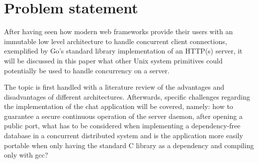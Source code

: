 \section{Problem statement}
After having seen how modern web frameworks provide their users with an immutable low level architecture to handle concurrent client connections, exemplified by Go's standard library implementation of an HTTP(s) server, it will be discussed in this paper what other Unix system primitives could potentially be used to handle concurrency on a server.

The topic is first handled with a literature review of the advantages and disadvantages of different architectures. Afterwards, specific challenges regarding the implementation of the chat application will be covered, namely: how to guarantee a secure continuous operation of the server daemon, after opening a public port, what has to be considered when implementing a dependency-free database in a concurrent distributed system and is the application more easily portable when only having the standard C library as a dependency and compiling only with gcc?